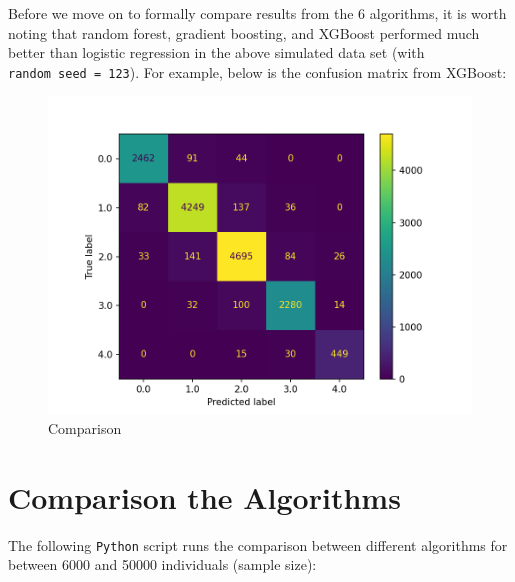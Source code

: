 \documentclass[
]{book}
\theoremstyle{definition}
\theoremstyle{definition}
\theoremstyle{definition}
\theoremstyle{definition}
\theoremstyle{remark}
\begin{document}
Before we move on to formally compare results from the 6 algorithms, it is worth noting that random forest, gradient boosting, and XGBoost performed much better than logistic regression in the above simulated data set (with \texttt{random\ seed\ =\ 123}). For example, below is the confusion matrix from XGBoost:

\begin{figure}
\centering
\includegraphics{images/cm_xgboost_False.png}
\caption{Comparison}
\end{figure}

\hypertarget{comparison-the-algorithms}{%
\section{Comparison the Algorithms}\label{comparison-the-algorithms}}

The following \texttt{Python} script runs the comparison between different algorithms for between 6000 and 50000 individuals (sample size):
\end{document}
